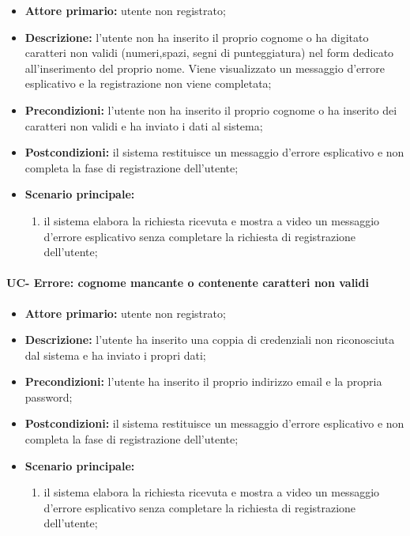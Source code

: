 	\begin{itemize}
		\item \textbf{Attore primario:} utente non registrato;

		\item \textbf{Descrizione:} l'utente non ha inserito il proprio cognome o ha digitato caratteri non validi (numeri,spazi, segni di punteggiatura) nel form dedicato all'inserimento del proprio nome. Viene visualizzato un messaggio d'errore esplicativo e la registrazione non viene completata;

		\item \textbf{Precondizioni:} l'utente non ha inserito il proprio cognome o ha inserito dei caratteri non validi e ha inviato i dati al sistema;

		\item \textbf{Postcondizioni:} il sistema restituisce un messaggio d'errore esplicativo e non completa la fase di registrazione dell'utente;

		\item \textbf{Scenario principale:}
	  		\begin{enumerate}
		  		\item il sistema elabora la richiesta ricevuta e mostra a video un messaggio d'errore esplicativo senza completare la richiesta di registrazione dell'utente; 
	  		\end{enumerate}
	\end{itemize}
 

\paragraph{UC- Errore: cognome mancante o contenente caratteri non validi}

	\begin{itemize}
		\item \textbf{Attore primario:} utente non registrato;

		\item \textbf{Descrizione:} l'utente ha inserito una coppia di credenziali non riconosciuta dal sistema e ha inviato i propri dati;

		\item \textbf{Precondizioni:} l'utente ha inserito il proprio indirizzo email e la propria password;

		\item \textbf{Postcondizioni:} il sistema restituisce un messaggio d'errore esplicativo e non completa la fase di registrazione dell'utente;

		\item \textbf{Scenario principale:}
	  		\begin{enumerate}
		  		\item il sistema elabora la richiesta ricevuta e mostra a video un messaggio d'errore esplicativo senza completare la richiesta di registrazione dell'utente; 
	  		\end{enumerate}
	\end{itemize}

